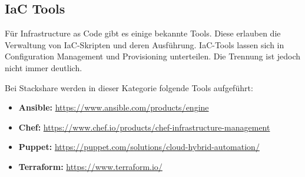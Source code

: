 \newpage
\subsection{IaC Tools}\label{iac}

Für Infrastructure as Code gibt es einige bekannte Tools.
Diese erlauben die Verwaltung von IaC-Skripten und deren Ausführung.
IaC-Tools lassen sich in Configuration Management und Provisioning unterteilen.
Die Trennung ist jedoch nicht immer deutlich.

Bei Stackshare werden in dieser Kategorie folgende Tools aufgeführt:

\begin{itemize}
    \item \textbf{Ansible:} \href{https://www.ansible.com/products/engine}{https://www.ansible.com/products/engine}
    \item \textbf{Chef:} \href{https://www.chef.io/products/chef-infrastructure-management}{https://www.chef.io/products/chef-infrastructure-management}
    \item \textbf{Puppet:} \href{https://puppet.com/solutions/cloud-hybrid-automation/}{https://puppet.com/solutions/cloud-hybrid-automation/}
    \item \textbf{Terraform:} \href{https://www.terraform.io/}{https://www.terraform.io/}
\end{itemize}
